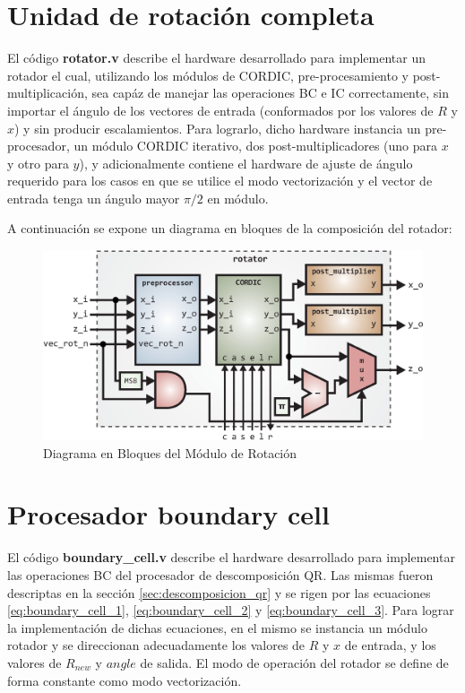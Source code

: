 \section{Unidad de rotación completa}

El código \textbf{rotator.v} describe el hardware desarrollado para implementar un rotador el cual, utilizando los módulos de CORDIC, pre-procesamiento y post-multiplicación, sea capáz de manejar las operaciones BC e IC correctamente, sin importar el ángulo de los vectores de entrada (conformados por los valores de $R$ y $x$) y sin producir escalamientos. Para lograrlo, dicho hardware instancia un pre-procesador, un módulo CORDIC iterativo, dos post-multiplicadores (uno para $x$ y otro para $y$), y adicionalmente contiene el hardware de ajuste de ángulo requerido para los casos en que se utilice el modo vectorización y el vector de entrada tenga un ángulo mayor $\pi/2$ en módulo.

A continuación se expone un diagrama en bloques de la composición del rotador:

\begin{figure}[!h]
 	\begin{center}
 		\includegraphics[width=15 cm]{./figures/C04-rotator_diagram}
 		\caption{Diagrama en Bloques del Módulo de Rotación}
		\label{rotator_diagram}
 	\end{center}
\end{figure}

\section{Procesador boundary cell}

El código \textbf{boundary\_cell.v} describe el hardware desarrollado para implementar las operaciones BC del procesador de descomposición QR. Las mismas fueron descriptas en la sección \ref{sec:descomposicion_qr} y se rigen por las ecuaciones \ref{eq:boundary_cell_1}, \ref{eq:boundary_cell_2} y \ref{eq:boundary_cell_3}. Para lograr la implementación de dichas ecuaciones, en el mismo se instancia un módulo rotador y se direccionan adecuadamente los valores de $R$ y $x$ de entrada, y los valores de $R_{new}$ y $angle$ de salida. El modo de operación del rotador se define de forma constante como modo vectorización.

